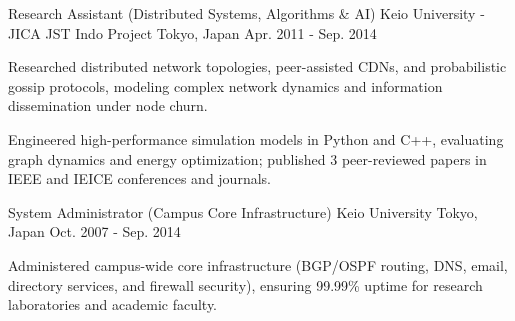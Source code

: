 \begin{cventries}
  \cventry
    {Research Assistant (Distributed Systems, Algorithms \& AI)} %
    {Keio University - JICA JST Indo Project} %
    {Tokyo, Japan} %
    {Apr. 2011 - Sep. 2014} %
    {
      \begin{cvitems} %
        \item {Researched distributed network topologies, peer-assisted CDNs, and probabilistic gossip protocols, modeling complex network dynamics and information dissemination under node churn.}
        \item {Engineered high-performance simulation models in Python and C++, evaluating graph dynamics and energy optimization; published 3 peer-reviewed papers in IEEE and IEICE conferences and journals.}
      \end{cvitems}
    }

  \cventry
    {System Administrator (Campus Core Infrastructure)} %
    {Keio University} %
    {Tokyo, Japan} %
    {Oct. 2007 - Sep. 2014} %
    {
      \begin{cvitems} %
        \item {Administered campus-wide core infrastructure (BGP/OSPF routing, DNS, email, directory services, and firewall security), ensuring 99.99\% uptime for research laboratories and academic faculty.}
      \end{cvitems}
    }

\end{cventries}
